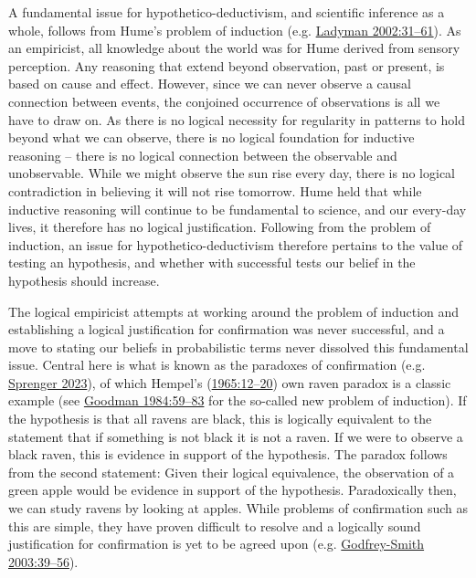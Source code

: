\documentclass[
  a4paper,
  oneside]{uiophdthesis}
\begin{document}
A fundamental issue for hypothetico-deductivism, and scientific inference as a whole, follows from Hume's problem of induction (e.g. \protect\hyperlink{ref-ladyman2002}{Ladyman 2002:31--61}). As an empiricist, all knowledge about the world was for Hume derived from sensory perception. Any reasoning that extend beyond observation, past or present, is based on cause and effect. However, since we can never observe a causal connection between events, the conjoined occurrence of observations is all we have to draw on. As there is no logical necessity for regularity in patterns to hold beyond what we can observe, there is no logical foundation for inductive reasoning -- there is no logical connection between the observable and unobservable. While we might observe the sun rise every day, there is no logical contradiction in believing it will not rise tomorrow. Hume held that while inductive reasoning will continue to be fundamental to science, and our every-day lives, it therefore has no logical justification. Following from the problem of induction, an issue for hypothetico-deductivism therefore pertains to the value of testing an hypothesis, and whether with successful tests our belief in the hypothesis should increase.

The logical empiricist attempts at working around the problem of induction and establishing a logical justification for confirmation was never successful, and a move to stating our beliefs in probabilistic terms never dissolved this fundamental issue. Central here is what is known as the paradoxes of confirmation (e.g. \protect\hyperlink{ref-sprenger2023}{Sprenger 2023}), of which Hempel's (\protect\hyperlink{ref-hempel1965}{1965:12--20}) own raven paradox is a classic example (see \protect\hyperlink{ref-goodman1983}{Goodman 1984:59--83} for the so-called new problem of induction). If the hypothesis is that all ravens are black, this is logically equivalent to the statement that if something is not black it is not a raven. If we were to observe a black raven, this is evidence in support of the hypothesis. The paradox follows from the second statement: Given their logical equivalence, the observation of a green apple would be evidence in support of the hypothesis. Paradoxically then, we can study ravens by looking at apples. While problems of confirmation such as this are simple, they have proven difficult to resolve and a logically sound justification for confirmation is yet to be agreed upon (e.g. \protect\hyperlink{ref-godfrey-smith2003}{Godfrey-Smith 2003:39--56}).
\end{document}
